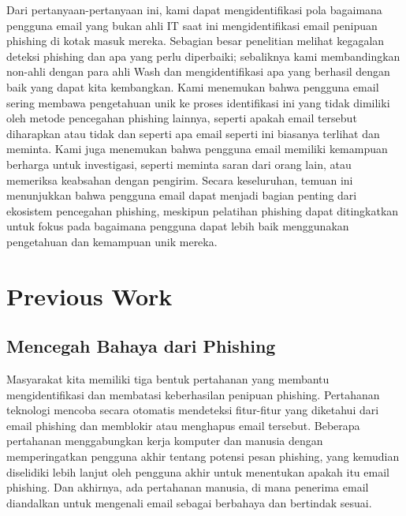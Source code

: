 \documentclass[lettersize,journal]{IEEEtran}
\begin{document}
Dari pertanyaan-pertanyaan ini, kami dapat mengidentifikasi pola bagaimana
pengguna email yang bukan ahli IT saat ini mengidentifikasi email penipuan
phishing di kotak masuk mereka. Sebagian besar penelitian melihat kegagalan
deteksi phishing dan apa yang perlu diperbaiki; sebaliknya kami membandingkan
non-ahli dengan para ahli Wash dan mengidentifikasi apa yang berhasil dengan
baik yang dapat kita kembangkan. Kami menemukan bahwa pengguna email sering
membawa pengetahuan unik ke proses identifikasi ini yang tidak dimiliki oleh
metode pencegahan phishing lainnya, seperti apakah email tersebut diharapkan
atau tidak dan seperti apa email seperti ini biasanya terlihat dan meminta.
Kami juga menemukan bahwa pengguna email memiliki kemampuan berharga untuk
investigasi, seperti meminta saran dari orang lain, atau memeriksa keabsahan
dengan pengirim. Secara keseluruhan, temuan ini menunjukkan bahwa pengguna
email dapat menjadi bagian penting dari ekosistem pencegahan phishing, meskipun
pelatihan phishing dapat ditingkatkan untuk fokus pada bagaimana pengguna dapat
lebih baik menggunakan pengetahuan dan kemampuan unik mereka.

\section{Previous Work}

\subsection{Mencegah Bahaya dari Phishing}
Masyarakat kita memiliki tiga bentuk pertahanan yang membantu mengidentifikasi
dan membatasi keberhasilan penipuan phishing. Pertahanan teknologi mencoba
secara otomatis mendeteksi fitur-fitur yang diketahui dari email phishing dan
memblokir atau menghapus email tersebut. Beberapa pertahanan menggabungkan
kerja komputer dan manusia dengan memperingatkan pengguna akhir tentang potensi
pesan phishing, yang kemudian diselidiki lebih lanjut oleh pengguna akhir untuk
menentukan apakah itu email phishing. Dan akhirnya, ada pertahanan manusia, di
mana penerima email diandalkan untuk mengenali email sebagai berbahaya dan
bertindak sesuai.
\end{document}
